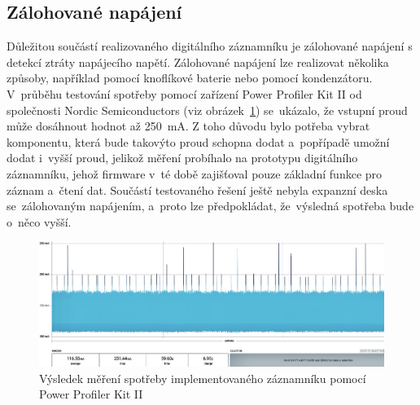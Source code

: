 \subsection{Zálohované napájení}
\label{zalohovane_napajeni_hw}
Důležitou součástí realizovaného digitálního záznamníku je zálohované napájení s detekcí ztráty napájecího napětí. Zálohované napájení lze realizovat několika způsoby, například pomocí knoflíkové baterie nebo pomocí kondenzátoru. V~průběhu testování spotřeby pomocí zařízení Power Profiler Kit II od společnosti Nordic Semiconductors (viz obrázek~\ref{fig:power-consumption}) se~ukázalo,  že vstupní proud může dosáhnout hodnot až \SI{250}{\milli\ampere}. Z toho důvodu bylo potřeba vybrat komponentu, která bude takovýto proud schopna dodat a~popřípadě umožní dodat i~vyšší proud, jelikož měření probíhalo na prototypu digitálního záznamníku, jehož firmware v~té době zajišťoval pouze základní funkce pro záznam a~čtení dat. Součástí testovaného řešení ještě nebyla expanzní deska se~zálohovaným napájením, a~proto lze předpokládat, že~výsledná spotřeba bude o~něco vyšší.~\cite{nordic_semi_ppk2}

\begin{figure}[h]
    \centering
    \includegraphics[width=1.00\textwidth]{obrazky-figures/power-consumption-4.jpg}
    
    \caption{Výsledek měření spotřeby implementovaného záznamníku pomocí Power Profiler Kit II 
   ~\cite{nordic_semi_ppk2}}
    \label{fig:power-consumption}
\end{figure}

